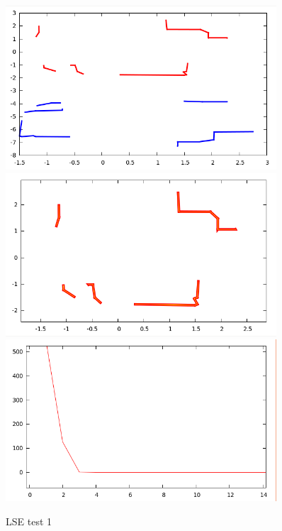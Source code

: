 \documentclass[a4paper, onecolumn]{report}
\begin{document}
\begin{figure}[htbp]
\centering
\includegraphics[width=0.9\textwidth]{images/foto_test/-5_-0.3_-4.7124/before_after.png}
\includegraphics[width=0.9\textwidth]{images/foto_test/-5_-0.3_-4.7124/result.png}
\includegraphics[width=0.9\textwidth]{images/foto_test/-5_-0.3_-4.7124/chi_new.png}

\caption{LSE test 1}
\end{figure}
\end{document}
